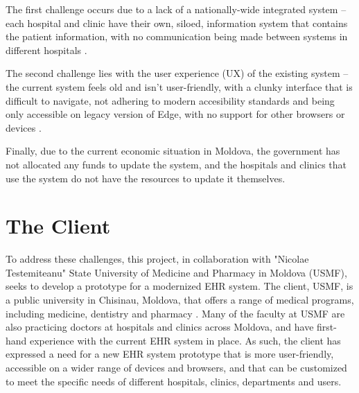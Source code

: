 The first challenge occurs due to a lack of a nationally-wide integrated system -- each hospital and clinic have their own, siloed, information system that contains the patient information, with no communication being made between systems in different hospitals \parencite{mdehr}. 

The second challenge lies with the user experience (UX) of the existing system -- the current system feels old and isn't user-friendly, with a clunky interface that is difficult to navigate, not adhering to modern accesibility standards and being only accessible on legacy version of Edge, with no support for other browsers or devices \parencite{mdehr}. 

Finally, due to the current economic situation in Moldova, the government has not allocated any funds to update the system, and the hospitals and clinics that use the system do not have the resources to update it themselves. 

\section{The Client}

To address these challenges, this project, in collaboration with "Nicolae Testemiteanu" State University of Medicine and Pharmacy in Moldova (USMF), seeks to develop a prototype for a modernized EHR system. The client, USMF, is a public university in Chisinau, Moldova, that offers a range of medical programs, including medicine, dentistry and pharmacy \parencite{mduni}. Many of the faculty at USMF are also practicing doctors at hospitals and clinics across Moldova, and have first-hand experience with the current EHR system in place. As such, the client has expressed a need for a new EHR system prototype that is more user-friendly, accessible on a wider range of devices and browsers, and that can be customized to meet the specific needs of different hospitals, clinics, departments and users.